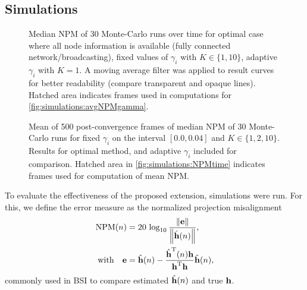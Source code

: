 \documentclass{article}
\begin{document}
\subsection[]{Simulations}
\begin{figure}[t]
    \centering
    
    \vspace*{-0.6cm}
    \caption[]{Median NPM of 30 Monte-Carlo runs over time for optimal case where all node information is available (fully connected network/broadcasting), fixed values of \(\gamma_i\) with \(K \in \{1,10\}\), adaptive \(\gamma_i\) with \(K=1\). A moving average filter was applied to result curves for better readability (compare transparent and opaque lines). Hatched area indicates frames used in computations for \autoref{fig:simulations:avgNPMgamma}.}
    \label{fig:simulations:NPMtime}
\end{figure}
\begin{figure}[t]
    \centering
    
    \vspace*{-0.6cm}
    \caption[]{Mean of 500 post-convergence frames of median NPM of 30 Monte-Carlo runs for fixed \(\gamma_i\) on the interval \([0.0, 0.04]\) and \(K \in \{1,2,10\}\). Results for optimal method, and adaptive \(\gamma_i\) included for comparison. Hatched area in \autoref{fig:simulations:NPMtime} indicates frames used for computation of mean NPM.}
    \label{fig:simulations:avgNPMgamma}
\end{figure}
To evaluate the effectiveness of the proposed extension, simulations were run.
For this, we define the error measure as the normalized projection misalignment
\begin{equation}
    \begin{aligned}
        \text{NPM}(n) &= 20\,\log_{10} \frac{\left\| \bm{\mathrm{e}} \right\|}{\left\|\hat{\bm{\mathrm{h}}}(n)\right\|},\\
        \text{with}\quad \bm{\mathrm{e}} &= \hat{\bm{\mathrm{h}}}(n) - \frac{\hat{\bm{\mathrm{h}}}^{\mathrm{T}} (n) \bm{\mathrm{h}}}{\bm{\mathrm{h}}^{\mathrm{T}} \bm{\mathrm{h}}}\hat{\bm{\mathrm{h}}}(n),
    \end{aligned}
\end{equation}
commonly used in BSI to compare estimated \(\hat{\bm{\mathrm{h}}}(n)\) and true \(\bm{\mathrm{h}}\).
\end{document}
